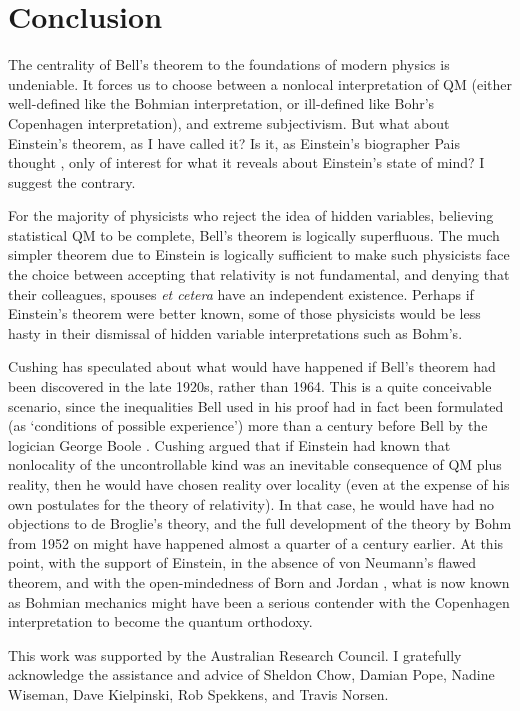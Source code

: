 \documentclass[12pt]{iopart}
\begin{document}
\section{Conclusion}

The centrality  of Bell's theorem to the foundations of modern physics is undeniable. 
It forces us to choose between a nonlocal interpretation of QM (either well-defined like the Bohmian interpretation, or ill-defined like Bohr's Copenhagen interpretation), and extreme subjectivism. 
But what about Einstein's theorem, as I have called it? Is it, as Einstein's biographer Pais thought \cite{Pai82}, only of interest for what it reveals about Einstein's state of mind? I suggest the contrary. 

For the majority of physicists who reject the idea of hidden variables, believing statistical QM to be complete,  Bell's theorem is logically superfluous. The much simpler theorem due to Einstein is logically sufficient to make such physicists face the choice between accepting that relativity is not fundamental, 
and denying that their colleagues, spouses {\em et cetera} have an independent existence. Perhaps if Einstein's theorem were better known, some of those physicists would be less hasty in their dismissal of hidden variable interpretations such as Bohm's. 

Cushing \cite{Cus94} has speculated about what would have happened if Bell's theorem had been 
discovered in the late 1920s, rather than 1964. This is a quite conceivable scenario, since the inequalities Bell used in his proof had in fact been formulated 
(as `conditions of possible experience') more than a century before Bell by the logician George Boole \cite{Boo1862}. Cushing argued that if Einstein had known that nonlocality of the uncontrollable kind was an inevitable consequence of QM plus reality, then he would have chosen 
reality over locality (even at the expense of his own postulates for the theory of relativity). 
In that case, he would have had no objections to de Broglie's 
theory, and the full development of the theory by Bohm from 1952 on might have happened almost 
a quarter of a century earlier. At this point, with the support of Einstein, in the absence of von Neumann's flawed theorem, and with the open-mindedness of Born and Jordan \cite{Dic98},  
what is now known as Bohmian mechanics might have been a serious contender with the Copenhagen interpretation to become the quantum orthodoxy. 

 \ack
This work was supported by the Australian Research Council.
I gratefully acknowledge the assistance and advice of Sheldon Chow, Damian Pope, Nadine Wiseman, Dave Kielpinski, Rob Spekkens, and Travis Norsen.
\end{document}
